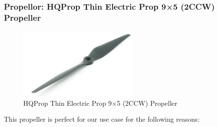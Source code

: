 \documentclass[12pt]{report}
\begin{document}
      \subsubsection{Propellor: HQProp Thin Electric Prop 9×5 (2CCW) Propeller}

      \begin{figure}
        \includegraphics[width=1\linewidth]{prop.png}
        \caption{HQProp Thin Electric Prop 9×5 (2CCW) Propeller}
        \label{fig:prop9x5}
      \end{figure}

      This propeller is perfect for our use case for the following reasons:
\end{document}
